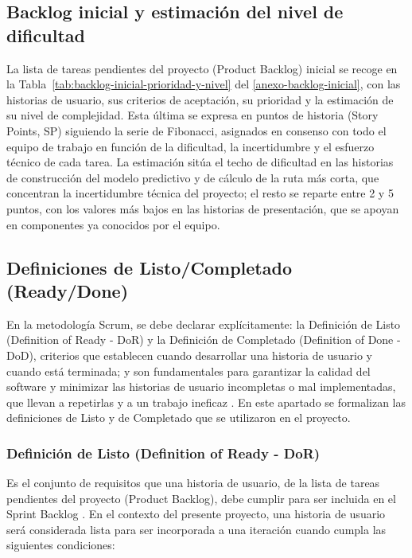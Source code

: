 \subsection{Backlog inicial y estimación del nivel de dificultad}\label{backlog-inicial-y-estimaciuxf3n-del-nivel-de-dificultad}

La lista de tareas pendientes del proyecto (Product Backlog) inicial se recoge en la Tabla~\ref{tab:backlog-inicial-prioridad-y-nivel} del \ref{anexo-backlog-inicial}, con las historias de usuario, sus criterios de aceptación, su prioridad y la estimación de su nivel de complejidad. Esta última se expresa en puntos de historia (Story Points, SP) siguiendo la serie de Fibonacci, asignados en consenso con todo el equipo de trabajo en función de la dificultad, la incertidumbre y el esfuerzo técnico de cada tarea. La estimación sitúa el techo de dificultad en las historias de construcción del modelo predictivo y de cálculo de la ruta más corta, que concentran la incertidumbre técnica del proyecto; el resto se reparte entre 2 y 5 puntos, con los valores más bajos en las historias de presentación, que se apoyan en componentes ya conocidos por el equipo.

\subsection{Definiciones de Listo/Completado (Ready/Done)}\label{definiciones-de-listocompletado-readydone}

En la metodología Scrum, se debe declarar explícitamente: la Definición de Listo (Definition of Ready - DoR) y la Definición de Completado (Definition of Done - DoD), criterios que establecen cuando desarrollar una historia de usuario y cuando está terminada; y son fundamentales para garantizar la calidad del software y minimizar las historias de usuario incompletas o mal implementadas, que llevan a repetirlas y a un trabajo ineficaz \citep{schwaber2020,plaskonka2023}. En este apartado se formalizan las definiciones de Listo y de Completado que se utilizaron en el proyecto.

\subsubsection{Definición de Listo (Definition of Ready - DoR)}\label{definiciuxf3n-de-listo-definition-of-ready---dor}

Es el conjunto de requisitos que una historia de usuario, de la lista de tareas pendientes del proyecto (Product Backlog), debe cumplir para ser incluida en el Sprint Backlog \citep{plaskonka2023}. En el contexto del presente proyecto, una historia de usuario será considerada lista para ser incorporada a una iteración cuando cumpla las siguientes condiciones:

